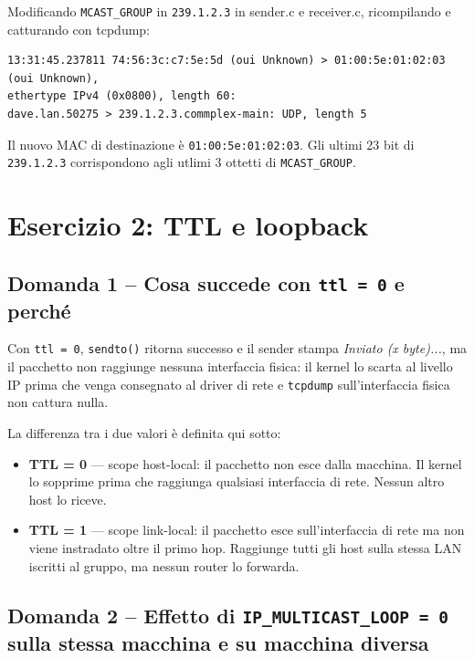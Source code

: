\documentclass[a4paper,12pt]{article}
\begin{document}
Modificando \texttt{MCAST\_GROUP} in \texttt{239.1.2.3} in sender.c e receiver.c,
ricompilando e catturando con tcpdump:

\begin{lstlisting}
13:31:45.237811 74:56:3c:c7:5e:5d (oui Unknown) > 01:00:5e:01:02:03 (oui Unknown),
ethertype IPv4 (0x0800), length 60:
dave.lan.50275 > 239.1.2.3.commplex-main: UDP, length 5
\end{lstlisting}

Il nuovo MAC di destinazione è \texttt{01:00:5e:01:02:03}. Gli ultimi 23 bit di
\texttt{239.1.2.3} corrispondono agli utlimi 3 ottetti di \texttt{MCAST\_GROUP}.

\section{Esercizio 2: TTL e loopback}

\subsection*{Domanda 1 -- Cosa succede con \texttt{ttl = 0} e perché}

Con \texttt{ttl = 0}, \texttt{sendto()} ritorna successo e il sender stampa
\textit{Inviato (x byte)...}, ma il pacchetto non raggiunge nessuna interfaccia fisica:
il kernel lo scarta al livello IP prima che venga consegnato al driver di rete e
\texttt{tcpdump} sull'interfaccia fisica non cattura nulla.

La differenza tra i due valori è definita qui sotto:

\begin{itemize}
  \item \textbf{TTL = 0} — scope host-local: il pacchetto non esce dalla macchina.
        Il kernel lo sopprime prima che raggiunga qualsiasi interfaccia di rete.
        Nessun altro host lo riceve.
  \item \textbf{TTL = 1} — scope link-local: il pacchetto esce sull'interfaccia
        di rete ma non viene instradato oltre il primo hop. Raggiunge tutti gli
        host sulla stessa LAN iscritti al gruppo, ma nessun router lo forwarda.
\end{itemize}

\newpage
\subsection*{Domanda 2 -- Effetto di \texttt{IP\_MULTICAST\_LOOP = 0} sulla stessa macchina e su macchina diversa}
\end{document}
